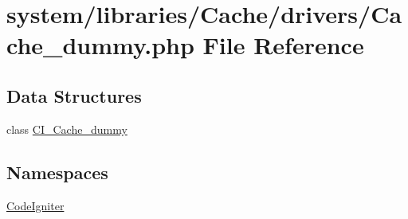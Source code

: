 \hypertarget{_cache__dummy_8php}{\section{system/libraries/\-Cache/drivers/\-Cache\-\_\-dummy.php File Reference}
\label{_cache__dummy_8php}
}
\subsection*{Data Structures}
\begin{DoxyCompactItemize}
\item 
class \hyperlink{class_c_i___cache__dummy}{C\-I\-\_\-\-Cache\-\_\-dummy}
\end{DoxyCompactItemize}
\subsection*{Namespaces}
\begin{DoxyCompactItemize}
\item 
\hyperlink{namespace_code_igniter}{Code\-Igniter}
\end{DoxyCompactItemize}
